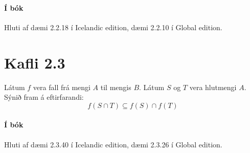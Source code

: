 \documentclass{article}
\begin{document}
\paragraph{Í bók} Hluti af dæmi 2.2.18 í Icelandic edition, dæmi 2.2.10 í Global edition.

\section{Kafli 2.3}

\question
Látum $f$ vera fall frá mengi $A$ til mengis $B$. Látum $S$ og $T$ vera hlutmengi $A$. Sýnið fram á eftirfarandi: \[f(S \cap T) \subseteq f(S) \cap f(T)\]

\paragraph{Í bók} Hluti af dæmi 2.3.40 í Icelandic edition, dæmi 2.3.26 í Global edition.
\end{document}
